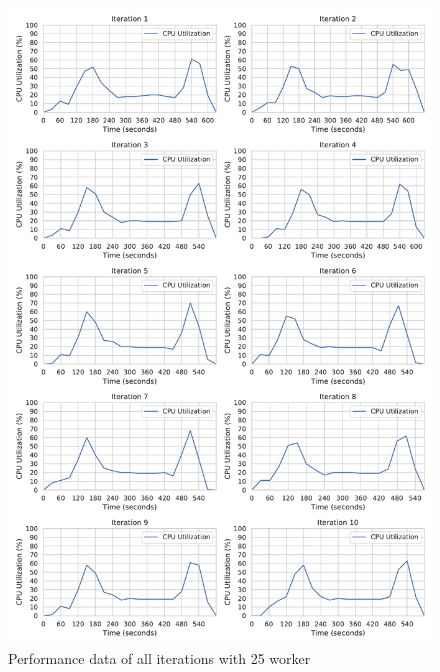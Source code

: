 \begin{figure}[h]
\centering
\includegraphics[scale=0.4]{images/07_evaluation/classification/25_worker_cpu_performance}
\caption{Performance data of all iterations with 25 worker}
\label{fig:appendix_eval_classification_static25}
\end{figure}

